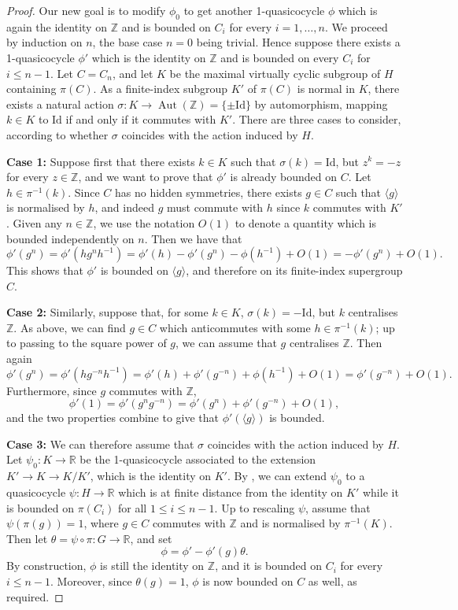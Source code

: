 \documentclass[svgnames]{amsart}
\theoremstyle{plain}
\theoremstyle{definition}
\newcommand{\Z}{\mathbb{Z}}
\newcommand{\R}{\mathbb{R}}
\newcommand{\Aut}[1]{\operatorname{Aut}\left(#1\right)}
\newcommand{\Id}{\text{Id}}
\begin{document}
\begin{proof}
Our new goal is to modify $\phi_0$ to get another 1-quasicocycle $\phi$ which is again the identity on $\Z$ and is bounded on $C_i$ for every $i=1,\ldots,n$. We proceed by induction on $n$, the base case $n=0$ being trivial. Hence suppose there exists a 1-quasicocycle $\phi'$ which is the identity on $\Z$ and is bounded on every $C_i$ for $i\le n-1$. Let $C=C_n$, and let $K$ be the maximal virtually cyclic subgroup of $H$ containing $\pi(C)$. As a finite-index subgroup $K'$ of $\pi(C)$ is normal in $K$, there exists a natural action $\sigma\colon K\to \Aut{\Z}=\{\pm \Id\}$ by automorphism, mapping $k\in K$ to $\Id$ if and only if it commutes with $K'$. There are three cases to consider, according to whether $\sigma$ coincides with the action induced by $H$. 
\par\medskip
    \textbf{Case 1:} Suppose first that there exists $k\in K$ such that $\sigma(k)=\Id$, but $z^k=-z$ for every $z\in \Z$, and we want to prove that $\phi'$ is already bounded on $C$. Let $h\in \pi^{-1}(k)$. Since $C$ has no hidden symmetries, there exists $g\in C$ such that $\langle g\rangle$ is normalised by $h$, and indeed $g$ must commute with $h$ since $k$ commutes with $K'$. Given any $n\in \Z$, we use the notation $O(1)$ to denote a quantity which is bounded independently on $n$. Then we have that
    $$\phi'(g^n)=\phi'(hg^nh^{-1})=\phi'(h) -\phi'(g^n)-\phi(h^{-1})+O(1)=-\phi'(g^n)+O(1).$$
    This shows that $\phi'$ is bounded on $\langle g\rangle$, and therefore on its finite-index supergroup $C$.
    \par\medskip
    \textbf{Case 2:} Similarly, suppose that, for some $k\in K$, $\sigma(k)=-\Id$, but $k$ centralises $\Z$. As above, we can find $g\in C$ which anticommutes with some $h\in \pi^{-1}(k)$; up to passing to the square power of $g$, we can assume that $g$ centralises $\Z$. Then again 
    $$\phi'(g^n)=\phi'(hg^{-n}h^{-1})=\phi'(h) +\phi'(g^{-n})+\phi(h^{-1})+O(1)=\phi'(g^{-n})+O(1).$$
    Furthermore, since $g$ commutes with $\Z$,
    $$\phi'(1)=\phi'(g^{n}g^{-n})=\phi'(g^{n})+\phi'(g^{-n})+O(1),$$
    and the two properties combine to give that $\phi'(\langle g\rangle)$ is bounded.
    \par\medskip
    \textbf{Case 3:} We can therefore assume that $\sigma$ coincides with the action induced by $H$. Let $\psi_0\colon K\to \R$ be the 1-quasicocycle associated to the extension $K'\to K\to K/K'$, which is the identity on $K'$. By \cite[Theorem 3.1]{Hull_Osin}, we can extend $\psi_0$ to a quasicocycle $\psi\colon H\to \R$ which is at finite distance from the identity on $K'$ while it is bounded on $\pi(C_i)$ for all $1\le i\le n-1$. Up to rescaling $\psi$, assume that $\psi(\pi(g))=1$, where $g\in C$ commutes with $\Z$ and is normalised by $\pi^{-1}(K)$.  Then let $\theta=\psi\circ \pi\colon G\to \R$, and set 
    $$\phi=\phi'-\phi'(g)\theta.$$
    By construction, $\phi$ is still the identity on $\Z$, and it is bounded on $C_i$ for every $i\le n-1$. Moreover, since $\theta(g)=1$, $\phi$ is now bounded on $C$ as well, as required.
\end{proof}
\end{document}
